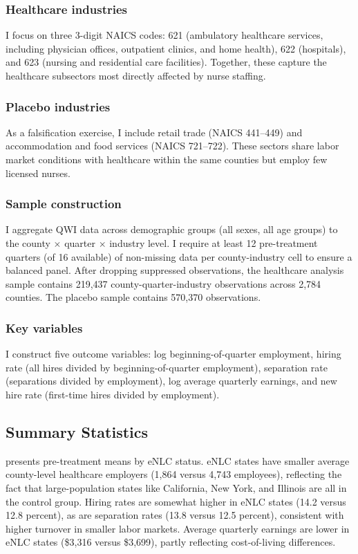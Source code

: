 \documentclass[12pt]{article}
\begin{document}
\subsubsection*{Healthcare industries} I focus on three 3-digit NAICS codes: 621 (ambulatory healthcare services, including physician offices, outpatient clinics, and home health), 622 (hospitals), and 623 (nursing and residential care facilities). Together, these capture the healthcare subsectors most directly affected by nurse staffing.

\subsubsection*{Placebo industries} As a falsification exercise, I include retail trade (NAICS 441--449) and accommodation and food services (NAICS 721--722). These sectors share labor market conditions with healthcare within the same counties but employ few licensed nurses.

\subsubsection*{Sample construction} I aggregate QWI data across demographic groups (all sexes, all age groups) to the county $\times$ quarter $\times$ industry level. I require at least 12 pre-treatment quarters (of 16 available) of non-missing data per county-industry cell to ensure a balanced panel. After dropping suppressed observations, the healthcare analysis sample contains 219,437 county-quarter-industry observations across 2,784 counties. The placebo sample contains 570,370 observations.

\subsubsection*{Key variables} I construct five outcome variables: log beginning-of-quarter employment, hiring rate (all hires divided by beginning-of-quarter employment), separation rate (separations divided by employment), log average quarterly earnings, and new hire rate (first-time hires divided by employment).

\subsection{Summary Statistics}



 presents pre-treatment means by eNLC status. eNLC states have smaller average county-level healthcare employers (1,864 versus 4,743 employees), reflecting the fact that large-population states like California, New York, and Illinois are all in the control group. Hiring rates are somewhat higher in eNLC states (14.2 versus 12.8 percent), as are separation rates (13.8 versus 12.5 percent), consistent with higher turnover in smaller labor markets. Average quarterly earnings are lower in eNLC states (\$3,316 versus \$3,699), partly reflecting cost-of-living differences.
\end{document}
